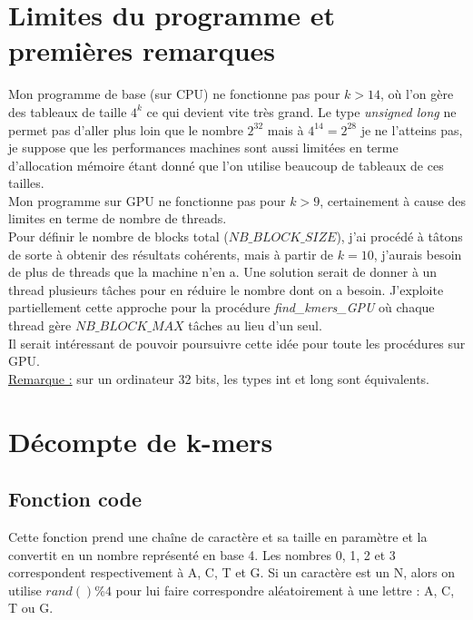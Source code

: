 \documentclass[10pt]{article}
\begin{document}
\section*{Limites du programme et premières remarques}


Mon programme de base (sur CPU) ne fonctionne pas pour $k > 14$, où l'on gère des tableaux de taille $4^{k}$ ce qui devient vite très grand. Le type \textit{unsigned long} ne permet pas d'aller plus loin que le nombre $2^{32}$ mais à $4^{14} = 2^{28}$ je ne l'atteins pas, je suppose que les performances machines sont aussi limitées en terme d'allocation mémoire étant donné que l'on utilise beaucoup de tableaux de ces tailles. \\


Mon programme sur GPU ne fonctionne pas pour $k > 9$, certainement à cause des limites en terme de nombre de threads. \\

Pour définir le nombre de blocks total ($NB\_BLOCK\_SIZE$), j'ai procédé à tâtons de sorte à obtenir des résultats cohérents, mais à partir de $k = 10$, j'aurais besoin de plus de threads que la machine n'en a. Une solution serait de donner à un thread plusieurs tâches pour en réduire le nombre dont on a besoin. J'exploite partiellement cette approche pour la procédure \textit{find\_kmers\_GPU} où chaque thread gère $NB\_BLOCK\_MAX$ tâches au lieu d'un seul. \\

Il serait intéressant de pouvoir poursuivre cette idée pour toute les procédures sur GPU. \\


\underline{Remarque :} sur un ordinateur 32 bits, les types int et long sont équivalents.

\section{Décompte de k-mers}


\subsection{Fonction code}


Cette fonction prend une cha\^{i}ne de caract\`{e}re et sa taille en param\`{e}tre et la convertit en un nombre représenté en base 4. Les nombres 0, 1, 2 et 3 correspondent respectivement \`{a} A, C, T et G. Si un caractère est un N, alors on utilise $rand() \% 4$ pour lui faire correspondre aléatoirement \`{a} une lettre : A, C, T ou G.
\end{document}
